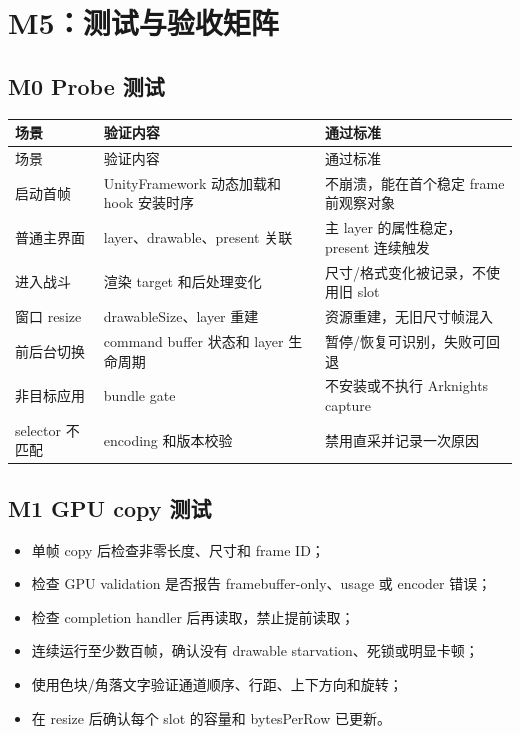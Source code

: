 \documentclass[UTF8,a4paper,11pt]{ctexart}
\begin{document}
\section{M5：测试与验收矩阵}

\subsection{M0 Probe 测试}

\begin{center}
\footnotesize
\begin{longtable}{>{\raggedright\arraybackslash}p{} >{\raggedright\arraybackslash}p{} >{\raggedright\arraybackslash}p{}}
\toprule
场景 & 验证内容 & 通过标准 \\
\midrule
\endfirsthead
\toprule
场景 & 验证内容 & 通过标准 \\
\midrule
\endhead
启动首帧 & UnityFramework 动态加载和 hook 安装时序 & 不崩溃，能在首个稳定 frame 前观察对象 \\
普通主界面 & layer、drawable、present 关联 & 主 layer 的属性稳定，present 连续触发 \\
进入战斗 & 渲染 target 和后处理变化 & 尺寸/格式变化被记录，不使用旧 slot \\
窗口 resize & drawableSize、layer 重建 & 资源重建，无旧尺寸帧混入 \\
前后台切换 & command buffer 状态和 layer 生命周期 & 暂停/恢复可识别，失败可回退 \\
非目标应用 & bundle gate & 不安装或不执行 Arknights capture \\
selector 不匹配 & encoding 和版本校验 & 禁用直采并记录一次原因 \\
\bottomrule
\end{longtable}
\end{center}

\subsection{M1 GPU copy 测试}

\begin{itemize}
  \item 单帧 copy 后检查非零长度、尺寸和 frame ID；
  \item 检查 GPU validation 是否报告 framebuffer-only、usage 或 encoder 错误；
  \item 检查 completion handler 后再读取，禁止提前读取；
  \item 连续运行至少数百帧，确认没有 drawable starvation、死锁或明显卡顿；
  \item 使用色块/角落文字验证通道顺序、行距、上下方向和旋转；
  \item 在 resize 后确认每个 slot 的容量和 bytesPerRow 已更新。
\end{itemize}
\end{document}
